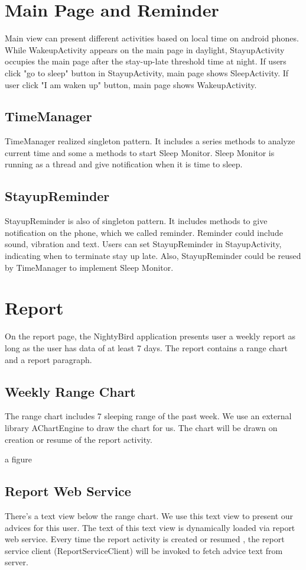 \documentclass[14pt]{extreport}
\begin{document}
\chapter{Main Page and Reminder}
Main view can present different activities based on local time on android phones. While WakeupActivity appears on the main page in daylight, StayupActivity occupies the main page after the stay-up-late threshold time at night. If users click "go to sleep" button in StayupActivity, main page shows SleepActivity. If user click "I am waken up" button, main page shows WakeupActivity. 

\section{TimeManager}
TimeManager realized singleton pattern. It includes a series methods to analyze current time and some a methods to start Sleep Monitor. Sleep Monitor is running as a thread and give notification when it is time to sleep.

\section{StayupReminder}
StayupReminder is also of singleton pattern. It includes methods to give notification on the phone, which we called reminder. Reminder could include sound, vibration and text. Users can set StayupReminder in StayupActivity, indicating when to terminate stay up late. Also, StayupReminder could be reused by TimeManager to implement Sleep Monitor.

\chapter{Report}
On the report page, the NightyBird application presents user a weekly report as long as the user has data of at least 7 days. The report contains a range chart and a report paragraph.
\section{Weekly Range Chart}
The range chart includes 7 sleeping range of the past week. We use an external library AChartEngine to draw the chart for us. The chart will be drawn on creation or resume of the report activity.

a figure

\section{Report Web Service}
There's a text view below the range chart. We use this text view to present our advices for this user. The text of this text view is dynamically loaded via report web service. Every time the report activity is created or resumed , the report service client (ReportServiceClient) will be invoked to fetch advice text from server. 
\end{document}
